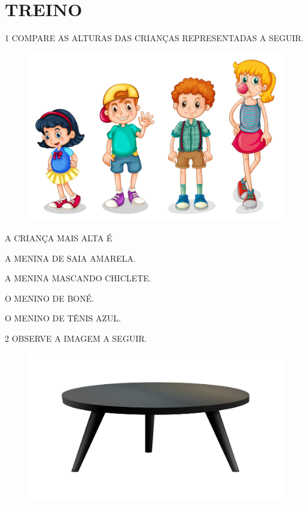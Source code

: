 \section*{TREINO}

\num{1} COMPARE AS ALTURAS DAS CRIANÇAS REPRESENTADAS A SEGUIR.


\begin{figure}[H]
\centering
\includegraphics[width=.6\textwidth]{./media/SAEB_1ANO_MAT_FIGURA43.png}
\end{figure}

A CRIANÇA MAIS ALTA É

\begin{escolha}[itemsep=-5pt]
\item A MENINA DE SAIA AMARELA.

\item A MENINA MASCANDO CHICLETE.

\item O MENINO DE BONÉ.

\item O MENINO DE TÊNIS AZUL.
\end{escolha}

\num{2} OBSERVE A IMAGEM A SEGUIR.

\begin{figure}[H]
\centering
\includegraphics[width=.4\textwidth]{media/image32b.jpg}
\end{figure}


